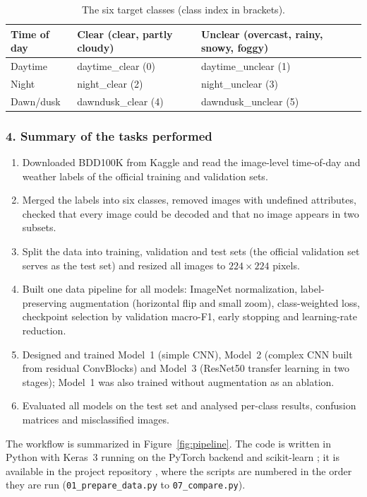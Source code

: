 \documentclass[12pt,letterpaper]{article}
\begin{document}
\begin{table}[htbp]
\centering\small
\caption{The six target classes (class index in brackets).}
\label{tab:classes}
\begin{tabular}{lll}
\toprule
Time of day & Clear (clear, partly cloudy) & Unclear (overcast, rainy, snowy, foggy) \\
\midrule
Daytime   & daytime\_clear (0)  & daytime\_unclear (1)  \\
Night     & night\_clear (2)    & night\_unclear (3)    \\
Dawn/dusk & dawndusk\_clear (4) & dawndusk\_unclear (5) \\
\bottomrule
\end{tabular}
\end{table}

\subsubsection{4. Summary of the tasks performed}
\begin{enumerate}[leftmargin=1.6em]
  \item Downloaded BDD100K from Kaggle and read the image-level time-of-day and weather labels of the official
        training and validation sets.
  \item Merged the labels into six classes, removed images with undefined attributes, checked that every image could
        be decoded and that no image appears in two subsets.
  \item Split the data into training, validation and test sets (the official validation set serves as the test set)
        and resized all images to $224\times224$ pixels.
  \item Built one data pipeline for all models: ImageNet normalization, label-preserving augmentation (horizontal flip
        and small zoom), class-weighted loss, checkpoint selection by validation macro-F1, early stopping and
        learning-rate reduction.
  \item Designed and trained Model~1 (simple CNN), Model~2 (complex CNN built from residual ConvBlocks) and Model~3
        (ResNet50 transfer learning in two stages); Model~1 was also trained without augmentation as an ablation.
  \item Evaluated all models on the test set and analysed per-class results, confusion matrices and misclassified
        images.
\end{enumerate}
The workflow is summarized in Figure~\ref{fig:pipeline}. The code is written in Python with Keras~3
\cite{chollet2015} running on the PyTorch backend \cite{paszke2019} and scikit-learn \cite{pedregosa2011}; it is
available in the project repository \cite{repo}, where the scripts are numbered in the order they are run
(\texttt{01\_prepare\_data.py} to \texttt{07\_compare.py}).
\end{document}
